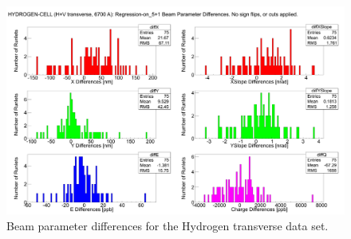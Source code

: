
\begin{figure}[!h]
	\begin{center}
	\includegraphics[width=15.0cm]{figures/differences_6700_LH2_off_on_5+1}
	\end{center}
	\caption
	{Beam parameter differences for the Hydrogen transverse data set.}
	\label{fig:differences_6700_LH2_off_on_5+1}
\end{figure}

